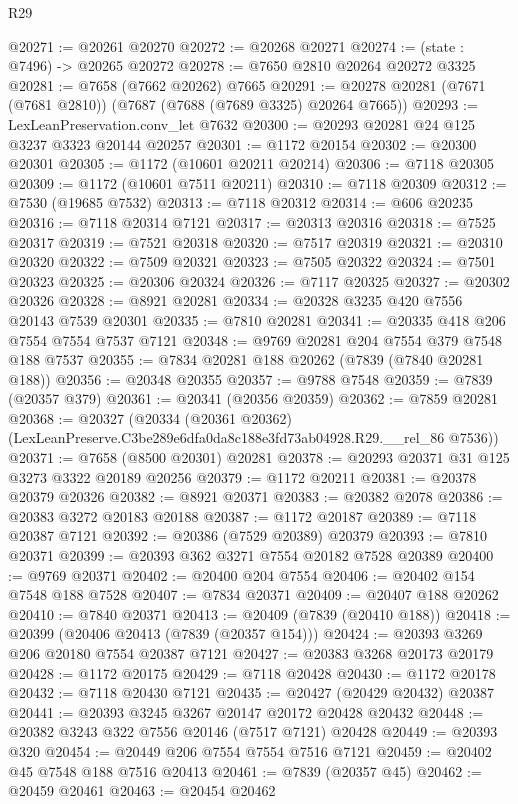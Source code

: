 \begin{lexlean}{R29}
\begin{coremodule}
@20271 := @20261 @20270
@20272 := @20268 @20271
@20274 := (state : @7496) -> @20265 @20272
@20278 := @7650 @2810 @20264 @20272 @3325
@20281 := @7658 (@7662 @20262) @7665
@20291 := @20278 @20281 (@7671 (@7681 @2810)) (@7687 (@7688 (@7689 @3325) @20264 @7665))
@20293 := LexLeanPreservation.conv_let @7632
@20300 := @20293 @20281 @24 @125 @3237 @3323 @20144 @20257
@20301 := @1172 @20154
@20302 := @20300 @20301
@20305 := @1172 (@10601 @20211 @20214)
@20306 := @7118 @20305
@20309 := @1172 (@10601 @7511 @20211)
@20310 := @7118 @20309
@20312 := @7530 (@19685 @7532)
@20313 := @7118 @20312
@20314 := @606 @20235
@20316 := @7118 @20314 @7121
@20317 := @20313 @20316
@20318 := @7525 @20317
@20319 := @7521 @20318
@20320 := @7517 @20319
@20321 := @20310 @20320
@20322 := @7509 @20321
@20323 := @7505 @20322
@20324 := @7501 @20323
@20325 := @20306 @20324
@20326 := @7117 @20325
@20327 := @20302 @20326
@20328 := @8921 @20281
@20334 := @20328 @3235 @420 @7556 @20143 @7539 @20301
@20335 := @7810 @20281
@20341 := @20335 @418 @206 @7554 @7554 @7537 @7121
@20348 := @9769 @20281 @204 @7554 @379 @7548 @188 @7537
@20355 := @7834 @20281 @188 @20262 (@7839 (@7840 @20281 @188))
@20356 := @20348 @20355
@20357 := @9788 @7548
@20359 := @7839 (@20357 @379)
@20361 := @20341 (@20356 @20359)
@20362 := @7859 @20281
@20368 := @20327
    (@20334 (@20361 @20362) (LexLeanPreserve.C3be289e6dfa0da8c188e3fd73ab04928.R29.__rel_86 @7536))
@20371 := @7658 (@8500 @20301) @20281
@20378 := @20293 @20371 @31 @125 @3273 @3322 @20189 @20256
@20379 := @1172 @20211
@20381 := @20378 @20379 @20326
@20382 := @8921 @20371
@20383 := @20382 @2078
@20386 := @20383 @3272 @20183 @20188
@20387 := @1172 @20187
@20389 := @7118 @20387 @7121
@20392 := @20386 (@7529 @20389) @20379
@20393 := @7810 @20371
@20399 := @20393 @362 @3271 @7554 @20182 @7528 @20389
@20400 := @9769 @20371
@20402 := @20400 @204 @7554
@20406 := @20402 @154 @7548 @188 @7528
@20407 := @7834 @20371
@20409 := @20407 @188 @20262
@20410 := @7840 @20371
@20413 := @20409 (@7839 (@20410 @188))
@20418 := @20399 (@20406 @20413 (@7839 (@20357 @154)))
@20424 := @20393 @3269 @206 @20180 @7554 @20387 @7121
@20427 := @20383 @3268 @20173 @20179
@20428 := @1172 @20175
@20429 := @7118 @20428
@20430 := @1172 @20178
@20432 := @7118 @20430 @7121
@20435 := @20427 (@20429 @20432) @20387
@20441 := @20393 @3245 @3267 @20147 @20172 @20428 @20432
@20448 := @20382 @3243 @322 @7556 @20146 (@7517 @7121) @20428
@20449 := @20393 @320
@20454 := @20449 @206 @7554 @7554 @7516 @7121
@20459 := @20402 @45 @7548 @188 @7516 @20413
@20461 := @7839 (@20357 @45)
@20462 := @20459 @20461
@20463 := @20454 @20462

\end{coremodule}
\end{lexlean}
